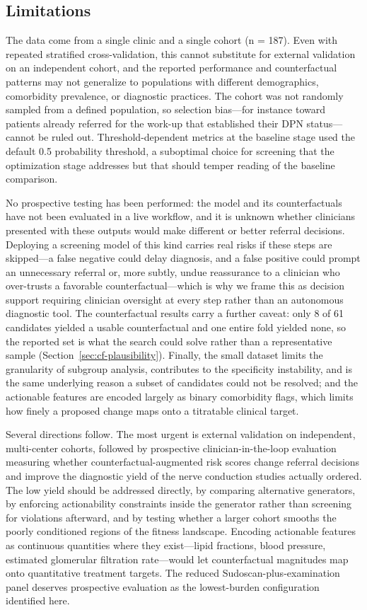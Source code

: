 \documentclass[pdflatex,sn-mathphys-num]{sn-jnl}%
\theoremstyle{thmstyleone}%
\theoremstyle{thmstyletwo}%
\theoremstyle{thmstylethree}%
\begin{document}
\subsection{Limitations}
\label{sec:limitations}
The data come from a single clinic and a single cohort (n = 187). Even with repeated stratified
cross-validation, this cannot substitute for external validation on an independent cohort, and the
reported performance and counterfactual patterns may not generalize to populations with different
demographics, comorbidity prevalence, or diagnostic practices. The cohort was not randomly sampled
from a defined population, so selection bias---for instance toward patients already referred for the
work-up that established their DPN status---cannot be ruled out. Threshold-dependent metrics at the
baseline stage used the default 0.5 probability threshold, a suboptimal choice for screening that the
optimization stage addresses but that should temper reading of the baseline comparison.

No prospective testing has been performed: the model and its counterfactuals have not been evaluated
in a live workflow, and it is unknown whether clinicians presented with these outputs would make
different or better referral decisions. Deploying a screening model of this kind carries real risks if
these steps are skipped---a false negative could delay diagnosis, and a false positive could prompt an
unnecessary referral or, more subtly, undue reassurance to a clinician who over-trusts a favorable
counterfactual---which is why we frame this as decision support requiring clinician oversight at every
step rather than an autonomous diagnostic tool. The counterfactual results carry a further caveat:
only 8 of 61 candidates yielded a usable counterfactual and one entire fold yielded none, so the
reported set is what the search could solve rather than a representative sample
(Section~\ref{sec:cf-plausibility}). Finally, the small dataset limits the granularity of subgroup
analysis, contributes to the specificity instability, and is the same underlying reason a subset of
candidates could not be resolved; and the actionable features are encoded largely as binary
comorbidity flags, which limits how finely a proposed change maps onto a titratable clinical target.

Several directions follow. The most urgent is external validation on independent, multi-center
cohorts, followed by prospective clinician-in-the-loop evaluation measuring whether
counterfactual-augmented risk scores change referral decisions and improve the diagnostic yield of the
nerve conduction studies actually ordered. The low yield should be addressed directly, by comparing
alternative generators, by enforcing actionability constraints inside the generator rather than
screening for violations afterward, and by testing whether a larger cohort smooths the poorly
conditioned regions of the fitness landscape. Encoding actionable features as continuous quantities
where they exist---lipid fractions, blood pressure, estimated glomerular filtration rate---would let
counterfactual magnitudes map onto quantitative treatment targets. The reduced Sudoscan-plus-examination
panel deserves prospective evaluation as the lowest-burden configuration identified here.
\end{document}
